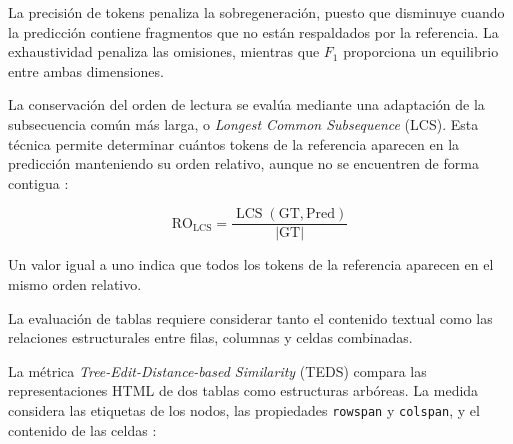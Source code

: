 La precisión de tokens penaliza la sobregeneración, puesto que disminuye cuando la predicción contiene fragmentos que no están respaldados por la referencia. La exhaustividad penaliza las omisiones, mientras que $F_1$ proporciona un equilibrio entre ambas dimensiones. 


La conservación del orden de lectura se evalúa mediante una adaptación de la subsecuencia común más larga, o \textit{Longest Common Subsequence} (LCS). Esta técnica permite determinar cuántos tokens de la referencia aparecen en la predicción manteniendo su orden relativo, aunque no se encuentren de forma contigua \cite{lin2004lcs}:

\begin{equation}
    \mathrm{RO}_{\mathrm{LCS}}
    =
    \frac{\operatorname{LCS}(\mathrm{GT},\mathrm{Pred})}{|\mathrm{GT}|}
    \label{eq:reading_order_lcs}
\end{equation}

Un valor igual a uno indica que todos los tokens de la referencia aparecen en el mismo orden relativo. 


La evaluación de tablas requiere considerar tanto el contenido textual como las relaciones estructurales entre filas, columnas y celdas combinadas. 


La métrica \textit{Tree-Edit-Distance-based Similarity} (TEDS) compara las representaciones HTML de dos tablas como estructuras arbóreas. La medida considera las etiquetas de los nodos, las propiedades \texttt{rowspan} y \texttt{colspan}, y el contenido de las celdas \cite{zhong2020teds}:

